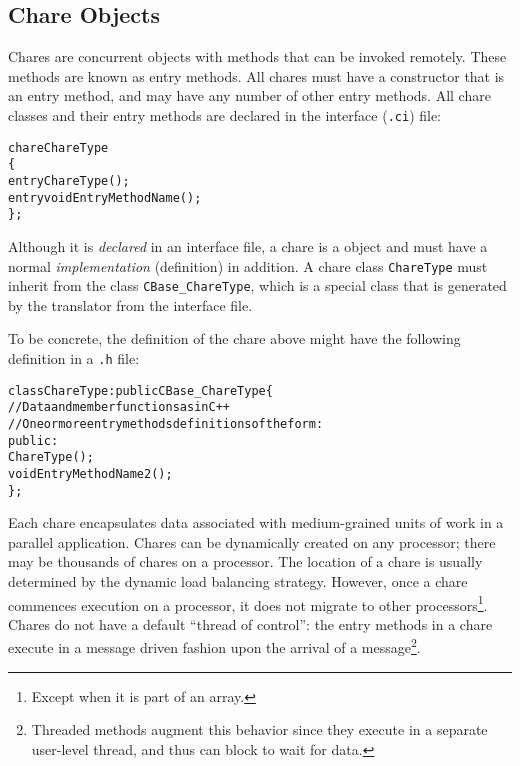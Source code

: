 \subsection{Chare Objects}

Chares are concurrent objects with methods that can be invoked
remotely. These methods are known as entry methods. All
chares must have a constructor that is an entry method, and may have any
number of other entry methods. All chare classes and their entry methods are
declared in the interface (\texttt{.ci}) file:

\begin{alltt}
chare ChareType
\{
    entry ChareType();
    entry void EntryMethodName();
\};
\end{alltt}

Although it is {\em declared} in an interface file, a chare is a \CC{} object and must
have a normal \CC{} {\em implementation} (definition) in addition. A chare
class {\tt ChareType} must inherit from the class {\tt CBase\_ChareType}, which
is a special class that is generated by the \charmpp translator from the
interface file.

To be concrete, the \CC{} definition of the chare above might have 
the following definition in a \texttt{.h} file:

\begin{alltt}
   class ChareType : public CBase\_ChareType \{
       // Data and member functions as in C++
       // One or more entry methods definitions of the form:
       public:
           ChareType();
           void EntryMethodName2();
   \};
\end{alltt}

Each chare encapsulates data associated with medium-grained units of work in a
parallel application.
Chares can be dynamically created on any processor; there may
be thousands of chares on a processor. The location of a chare is
usually determined by the dynamic load balancing strategy. However,
once a chare commences execution on a processor, it does not migrate
to other processors\footnote{Except when it is part of an array.}.  
Chares do not have a default ``thread of
control'': the entry methods  in a
chare execute in a message driven fashion upon the arrival of a 
message\footnote{Threaded methods augment this behavior since they execute in
a separate user-level thread, and thus can block to wait for data.}.

